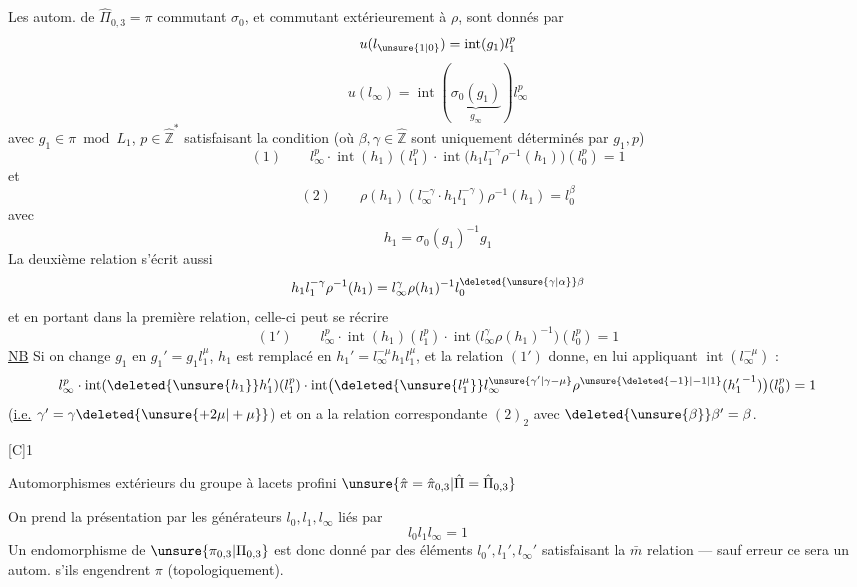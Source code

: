 
Les autom.  de $\hat\Pi_{0,3}=\pi$ commutant  $\sigma_0$, et commutant extérieurement à $\rho$, sont donnés par
\[
u(l_{\unsure{1|0}})=\operatorname{int}(g_1)l_1^{p}
\]
\[
u(l_\infty)=\operatorname{int}(\underbrace{\sigma_0(g_1)}_{g_\infty})l_\infty^{p}
\]
avec $g_1\in\pi\bmod L_1$, $p\in\hat{\mathbb Z}^{*}$ satisfaisant la condition (où $\beta,\gamma\in\hat{\mathbb Z}$ sont uniquement déterminés par $g_1,p$)
\[
(1)\qquad\boxed{l_\infty^{p}\cdot\operatorname{int}(h_1)(l_1^{p})\cdot\operatorname{int}\bigl(h_1l_1^{-\gamma}\rho^{-1}(h_1)\bigr)(l_0^{p})=1}
\]
et
\[
(2)\qquad\boxed{\rho(h_1)(l_\infty^{-\gamma}\cdot h_1l_1^{-\gamma})\rho^{-1}(h_1)=l_0^\beta}
\]
avec
\[
h_1=\sigma_0(g_1)^{-1}g_1
\]
La deuxième relation s'écrit aussi
\[
h_1l_1^{-\gamma}\rho^{-1}(h_1)=l_\infty^\gamma\rho(h_1)^{-1}l_0^{\deleted{\unsure{\gamma|\alpha}}\beta}
\]
et en portant dans la première relation, celle-ci peut se récrire
\[
(1')\qquad\boxed{l_\infty^{p}\cdot\operatorname{int}(h_1)(l_1^{p})\cdot\operatorname{int}\bigl(l_\infty^\gamma\rho(h_1)^{-1}\bigr)(l_0^{p})=1}
\]
\uline{NB} Si on change $g_1$ en $g_1'=g_1l_1^\mu$, $h_1$ est remplacé en $h_1'=l_\infty^{-\mu}h_1l_1^\mu$, et la relation $(1')$ donne, en lui appliquant $\operatorname{int}(l_\infty^{-\mu})$ :
\[
l_\infty^{p}\cdot\operatorname{int}(\deleted{\unsure{h_1}}h_1')(l_1^{p})\cdot\operatorname{int}\bigl(\deleted{\unsure{l_1^\mu}}l_\infty^{\unsure{\gamma'|\gamma-\mu}}\rho^{\unsure{\deleted{-1}|-1|1}}({h_1'}^{-1})\bigr)(l_0^{p})=1
\]
(\uline{i.e.} \uline{$\gamma'=\gamma\deleted{\unsure{+2\mu|+\mu}}$}) et on a la relation correspondante  $(2)_2$ avec $\deleted{\unsure{\beta}}\beta'=\beta$.

[C]\qquad\textcircled{1}\qquad{}

Automorphismes extérieurs du groupe à lacets  profini $\unsure{\hat\pi=\hat\pi_{0,3}|\hat\Pi=\hat\Pi_{0,3}}$
\margin{$\unsure{\partial|\delta}$}

On prend la présentation par les générateurs $l_0,l_1,l_\infty$ liés par
\[
l_0l_1l_\infty=1
\]
Un endomorphisme de $\unsure{\pi_{0,3}|\Pi_{0,3}}$ est donc donné par des éléments $l_0',l_1',l_\infty'$ satisfaisant la $\bar m$ relation --- sauf erreur ce sera un autom. s'ils engendrent $\pi$ (topologiquement).

